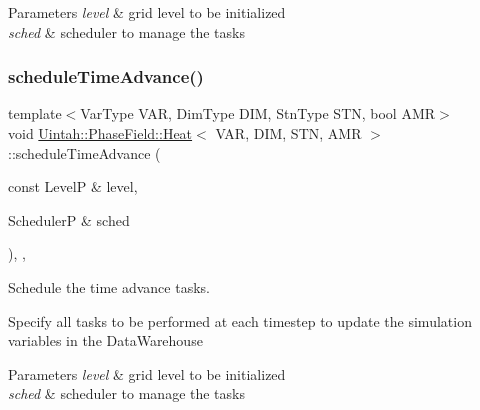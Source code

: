 \begin{DoxyParams}{Parameters}
{\em level} & grid level to be initialized \\
\hline
{\em sched} & scheduler to manage the tasks \\
\hline
\end{DoxyParams}
\mbox{\label{classUintah_1_1PhaseField_1_1Heat_a700f9df2ccf60f560f776dc95ef4883e}} 
\subsubsection{\texorpdfstring{schedule\+Time\+Advance()}{scheduleTimeAdvance()}}
{\footnotesize\ttfamily template$<$Var\+Type V\+AR, Dim\+Type D\+IM, Stn\+Type S\+TN, bool A\+MR$>$ \\
void \hyperlink{classUintah_1_1PhaseField_1_1Heat}{Uintah\+::\+Phase\+Field\+::\+Heat}$<$ V\+AR, D\+IM, S\+TN, A\+MR $>$\+::schedule\+Time\+Advance (\begin{DoxyParamCaption}\item[{const LevelP \&}]{level,  }\item[{SchedulerP \&}]{sched }\end{DoxyParamCaption})\hspace{0.3cm}{\ttfamily [override]}, {\ttfamily [protected]}, {\ttfamily [virtual]}}



Schedule the time advance tasks. 

Specify all tasks to be performed at each timestep to update the simulation variables in the Data\+Warehouse


\begin{DoxyParams}{Parameters}
{\em level} & grid level to be initialized \\
\hline
{\em sched} & scheduler to manage the tasks \\
\hline
\end{DoxyParams}
\mbox{\label{classUintah_1_1PhaseField_1_1Heat_a4050259130c6c4b8fa97ec69cd646067}} 

